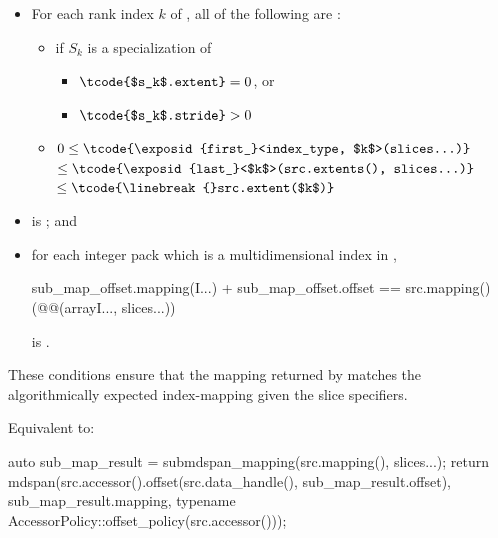 \begin{itemdescr}
\pnum
\expects
\begin{itemize}
\item
For each rank index $k$ of ,
all of the following are :
  \begin{itemize}
  \item
  if $S_k$ is a specialization of 
    \begin{itemize}
    \item $\tcode{$s_k$.extent} = 0$, or
    \item $\tcode{$s_k$.stride} > 0$
    \end{itemize}
  \item
  $0 \le \tcode{\exposid{first_}<index_type, $k$>(slices...)}$
  $\le \tcode{\exposid{last_}<$k$>(src.extents(), slices...)}$
  $\le \tcode{\linebreak{}src.extent($k$)}$
  \end{itemize}

\item
{}\linebreak
is ; and

\item
for each integer pack  which is a multidimensional index
in ,
\begin{codeblock}
sub_map_offset.mapping(I...) + sub_map_offset.offset ==
  src.mapping()(@@(array{I...}, slices...))
\end{codeblock}
is .
\end{itemize}

\begin{note}
These conditions ensure that the mapping returned by 
matches the algorithmically expected index-mapping given the slice specifiers.
\end{note}

\pnum
\effects
Equivalent to:
\begin{codeblock}
auto sub_map_result = submdspan_mapping(src.mapping(), slices...);
return mdspan(src.accessor().offset(src.data_handle(), sub_map_result.offset),
              sub_map_result.mapping,
              typename AccessorPolicy::offset_policy(src.accessor()));
\end{codeblock}
\end{itemdescr}

